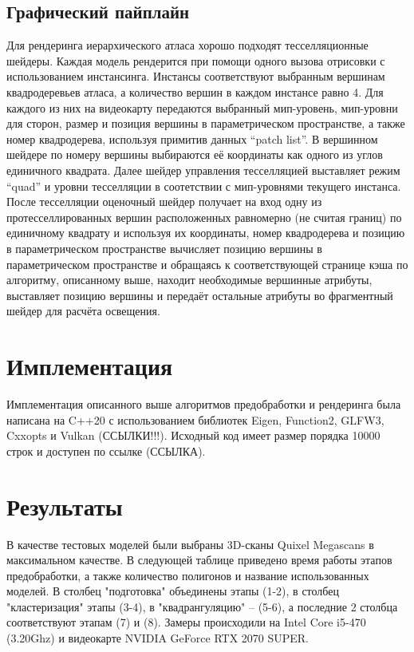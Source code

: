 \documentclass{article}
\begin{document}
\subsection{Графический пайплайн}
Для рендеринга иерархического атласа хорошо подходят тесселляционные шейдеры. Каждая модель рендерится при помощи одного вызова отрисовки с использованием инстансинга. Инстансы соответствуют выбранным вершинам квадродеревьев атласа, а количество вершин в каждом инстансе равно 4. Для каждого из них на видеокарту передаются выбранный мип-уровень, мип-уровни для сторон, размер и позиция вершины в параметрическом пространстве, а также номер квадродерева, используя примитив данных ``patch list''. В вершинном шейдере по номеру вершины выбираются её координаты как одного из углов единичного квадрата. Далее шейдер управления тесселляцией выставляет режим ``quad'' и уровни тесселляции в соотетствии с мип-уровнями текущего инстанса. После тесселляции оценочный шейдер получает на вход одну из протесселлированных вершин расположенных равномерно (не считая границ) по единичному квадрату и используя их координаты, номер квадродерева и позицию в параметрическом пространстве вычисляет позицию вершины в параметрическом пространстве и обращаясь к соответствующей странице кэша по алгоритму, описанному выше, находит необходимые вершинные атрибуты, выставляет позицию вершины и передаёт остальные атрибуты во фрагментный шейдер для расчёта освещения.

\section{Имплементация}
Имплементация описанного выше алгоритмов предобработки и рендеринга была написана на C++20 с использованием библиотек Eigen, Function2, GLFW3, Cxxopts и Vulkan (ССЫЛКИ!!!). Исходный код имеет размер порядка 10000 строк и доступен по ссылке (ССЫЛКА).


\section{Результаты}
В качестве тестовых моделей были выбраны 3D-сканы Quixel Megascans \cite{quixel_megascans} в максимальном качестве. В следующей таблице приведено время работы этапов предобработки, а также количество полигонов и название использованных моделей. В столбец "подготовка" объединены этапы (1-2), в столбец "кластеризация" этапы (3-4), в "квадрангуляцию" -- (5-6), а последние 2 столбца соответствуют этапам (7) и (8). Замеры происходили на Intel Core i5-470 (3.20Ghz) и видеокарте NVIDIA GeForce RTX 2070 SUPER.
\end{document}
